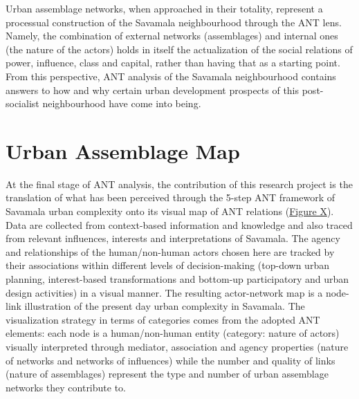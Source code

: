 \documentclass[11pt]{report}
\begin{document}
{{{{Urban assemblage networks, when approached in their totality, represent a processual construction of the Savamala neighbourhood through the ANT lens. Namely, the combination of external networks (assemblages) and internal ones (the nature of the actors) holds in itself the actualization of the social relations of power, influence, class and capital, rather than having that as a starting point. From this perspective, ANT analysis of the Savamala neighbourhood contains answers to how and why certain urban development prospects of this post-socialist neighbourhood have come into being.


\section{Urban Assemblage Map}

At the final stage of ANT analysis, the contribution of this research project is the translation of what has been perceived through the 5-step ANT framework of Savamala urban complexity onto its visual map of ANT relations (\href{Figure 9 ANT diagram}{Figure X}). 
\\

Data are collected from context-based information and knowledge and also traced from relevant influences, interests and interpretations of Savamala. The agency and relationships of the human/non-human actors chosen here are tracked by their associations within different levels of decision-making (top-down urban planning, interest-based transformations and bottom-up participatory and urban design activities) in a visual manner. The resulting actor-network map is a node-link illustration of the present day urban complexity in Savamala.  The visualization strategy in terms of categories comes from the adopted ANT elements:  each node is a human/non-human entity (category:  nature of actors) visually interpreted through mediator, association and agency properties (nature of networks and networks of influences) while the number and quality of links (nature of assemblages) represent the type and number of urban assemblage networks they contribute to.
\\

}}}}
\end{document}
